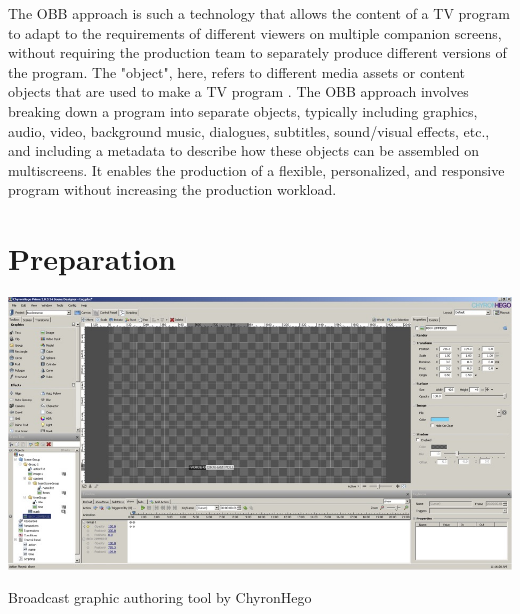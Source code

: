 \documentclass[sigchi-a, authorversion]{acmart}
\begin{document}
The OBB approach is such a technology that allows the content of a TV program to adapt to the requirements of different viewers on multiple companion screens, without requiring the production team to separately produce different versions of the program. The "object", here, refers to different media assets or content objects that are used to make a TV program \cite{armstrong2014}. The OBB approach involves breaking down a program into separate objects, typically including graphics, audio, video, background music, dialogues, subtitles, sound/visual effects, etc., and including a metadata to describe how these objects can be assembled on multiscreens. It enables the production of a flexible, personalized, and responsive program without increasing the production workload\cite{kegel2017, williams2016}.

\section{Preparation}

\begin{marginfigure}
    \includegraphics[width=\marginparwidth]{Figures/ChyronHegotool.jpg}
    \caption{Broadcast graphic authoring tool by ChyronHego}
    \label{fig:chyronhego}
\end{marginfigure}
\end{document}
